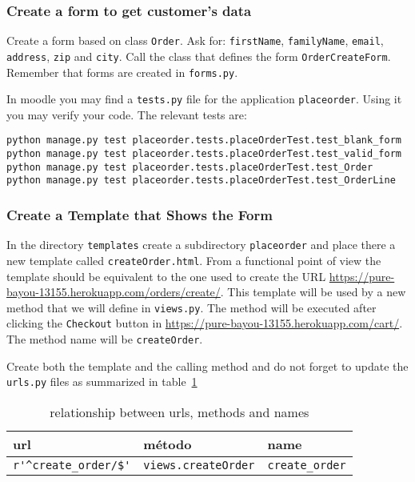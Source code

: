 \documentclass[12pt]{article} %
\newcommand{\ttt}[1]{\texttt{#1}}%
\newcommand{\hhh}[1]{\texttt{#1}}%
\newcommand{\views}{\texttt{views.py}}%
\newcommand{\urls}{\texttt{urls.py}}%
\newcommand{\forms}{\texttt{forms.py}}%
\newcommand{\tests}{\texttt{tests.py}}%
\begin{document}
\subsubsection{Create a form to get customer's data}

Create a form based on class \ttt{Order}. Ask for: \ttt{firstName}, \ttt{familyName}, \ttt{email}, \ttt{address}, \ttt{zip} and \ttt{city}. Call the class that defines the form  \ttt{OrderCreateForm}. Remember that forms are created in \forms.

In moodle you may find a \tests{} file for the application \ttt{placeorder}. Using it you may verify your code. The relevant tests are:

\begin{verbatim}
python manage.py test placeorder.tests.placeOrderTest.test_blank_form 
python manage.py test placeorder.tests.placeOrderTest.test_valid_form 
python manage.py test placeorder.tests.placeOrderTest.test_Order
python manage.py test placeorder.tests.placeOrderTest.test_OrderLine

\end{verbatim}


\subsubsection{Create a Template that Shows the Form}
In the directory \ttt{templates} create a subdirectory \ttt{placeorder} and place there a new template called \hhh{createOrder.html}. From a functional point of view the template should be equivalent to the one used to create the  URL \url{https://pure-bayou-13155.herokuapp.com/orders/create/}. This template will be used by a new method that we will define in \views{}. The method will be executed after clicking the \ttt{Checkout} button in \url{https://pure-bayou-13155.herokuapp.com/cart/}. The method name will be \ttt{createOrder}. 

Create both the template and the calling method and do not forget to update the \urls{} files as summarized in  table~\ref{tab:urlsplaceorder}

\begin{table}[H]
\centering
\begin{tabular}{lll}
    \textbf{url} & \textbf{método} & \textbf{name} \\ \hline
 \verb|r'^create_order/$'|  & \verb|views.createOrder|  & \verb|create_order|\\
\end{tabular}
\caption{relationship between urls, methods and names}
\label{tab:urlsplaceorder}
\end{table}
\end{document}
